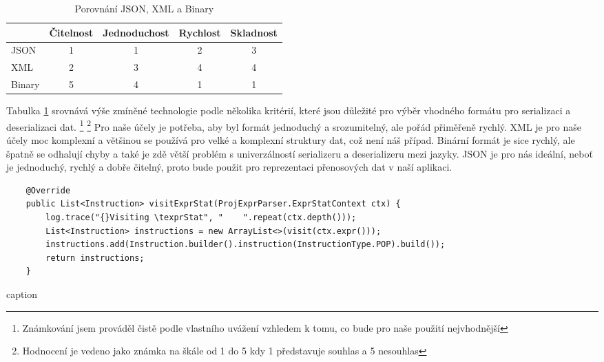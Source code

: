 \begin{table}[h]
    \centering
    \begin{tabular}{|l|c|c|c|c|}
        \hline
               & Čitelnost & Jednoduchost & Rychlost & Skladnost \\
        \hline
        JSON   & 1         & 1            & 2        & 3         \\
        \hline
        XML    & 2         & 3            & 4        & 4         \\
        \hline
        Binary & 5         & 4            & 1        & 1         \\
        \hline
    \end{tabular}
    \caption{Porovnání JSON, XML a Binary }
    \label{tab:formats_comparison}
\end{table}

Tabulka \ref{tab:formats_comparison} srovnává výše zmíněné technologie podle několika kritérií, které jsou důležité pro výběr vhodného formátu pro serializaci a deserializaci dat. \footnote[1]{Známkování jsem prováděl čistě podle vlastního uvážení vzhledem k tomu, co bude pro naše použití nejvhodnější} \footnote[2]{Hodnocení je vedeno jako známka na škále od 1 do 5 kdy 1 představuje souhlas a 5 nesouhlas} Pro naše účely je potřeba, aby byl formát jednoduchý a srozumitelný, ale pořád přiměřeně rychlý. XML je pro naše účely moc komplexní a většinou se používá pro velké a komplexní struktury dat, což není náš případ. Binární formát je sice rychlý, ale špatně se odhalují chyby a také je zdě větší problém s univerzálností serializeru a deserializeru mezi jazyky. JSON je pro nás ideální, neboť je jednoduchý, rychlý a dobře čitelný, proto bude použit pro reprezentaci přenosových dat v naší aplikaci.


\begin{listing}[H]
    \begin{verbatim}
    @Override
    public List<Instruction> visitExprStat(ProjExprParser.ExprStatContext ctx) {
        log.trace("{}Visiting \texprStat", "    ".repeat(ctx.depth()));
        List<Instruction> instructions = new ArrayList<>(visit(ctx.expr()));
        instructions.add(Instruction.builder().instruction(InstructionType.POP).build());
        return instructions;
    }

    \end{verbatim}

    \caption{caption}
    \label{code:label}
\end{listing}

\endinput